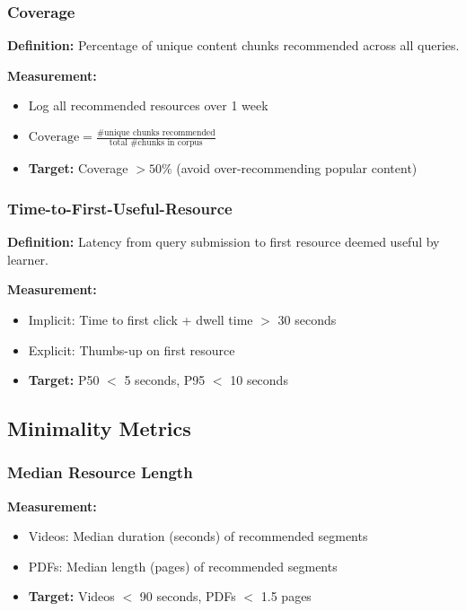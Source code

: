 \documentclass[11pt,letterpaper]{article}
\begin{document}
\subsubsection{Coverage}

\textbf{Definition:} Percentage of unique content chunks recommended across all queries.

\textbf{Measurement:}
\begin{itemize}
\item Log all recommended resources over 1 week
\item $\text{Coverage} = \frac{\text{\# unique chunks recommended}}{\text{total \# chunks in corpus}}$
\item \textbf{Target:} Coverage $> 50\%$ (avoid over-recommending popular content)
\end{itemize}

\subsubsection{Time-to-First-Useful-Resource}

\textbf{Definition:} Latency from query submission to first resource deemed useful by learner.

\textbf{Measurement:}
\begin{itemize}
\item Implicit: Time to first click + dwell time $>$ 30 seconds
\item Explicit: Thumbs-up on first resource
\item \textbf{Target:} P50 $<$ 5 seconds, P95 $<$ 10 seconds
\end{itemize}

\subsection{Minimality Metrics}

\subsubsection{Median Resource Length}

\textbf{Measurement:}
\begin{itemize}
\item Videos: Median duration (seconds) of recommended segments
\item PDFs: Median length (pages) of recommended segments
\item \textbf{Target:} Videos $<$ 90 seconds, PDFs $<$ 1.5 pages
\end{itemize}
\end{document}

